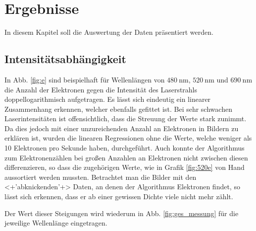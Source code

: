 \documentclass[bachelor,       %
               twoside,        %
               BCOR10mm,       %
               english,ngerman, %
               ]{GAUBM}
\begin{document}
\chapter{Ergebnisse}
In diesem Kapitel soll die Auswertung der Daten präsentiert werden.

\section{Intensitätsabhängigkeit}
In Abb. \ref{fig:e} sind beispielhaft für Wellenlängen von $\SI{480}{\nano\meter}$, $\SI{520}{\nano\meter}$ und $\SI{690}{\nano\meter}$ die Anzahl der Elektronen gegen die Intensität des Laserstrahls doppellogarithmisch aufgetragen.
Es lässt sich eindeutig ein linearer Zusammenhang erkennen, welcher ebenfalls gefittet ist.
Bei sehr schwachen Laserintensitäten ist offensichtlich, dass die Streuung der Werte stark zunimmt.
Da dies jedoch mit einer unzureichenden Anzahl an Elektronen in Bildern zu erklären ist, wurden die linearen Regressionen ohne die Werte, welche weniger als 10 Elektronen pro Sekunde haben, durchgeführt.
Auch konnte der Algorithmus zum Elektronenzählen bei großen Anzahlen an Elektronen nicht zwischen diesen differenzieren, so dass die zugehörigen Werte, wie in Grafik \ref{fig:520e} von Hand aussortiert werden mussten.
Betrachtet man die Bilder mit den <+'abknickenden'+> Daten, an denen der Algorithmus Elektronen findet, so lässt sich erkennen, dass er ab einer gewissen Dichte viele nicht mehr zählt.


Der Wert dieser Steigungen wird wiederum in Abb. \ref{fig:ges_messung} für die jeweilige Wellenlänge eingetragen.\newline\newline
\end{document}
